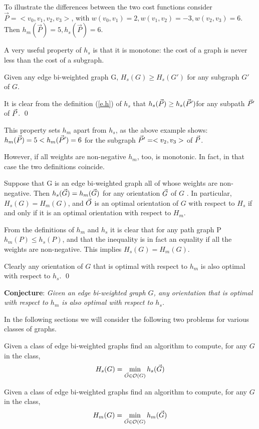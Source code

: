  To illustrate the differences between the two cost functions consider\\
 $\vec{P}=<v_0,v_1,v_2,v_3>$, with $w(v_0,v_1)=2, w(v_1,v_2)=-3,w(v_2,v_3)=6$.
 Then $h_m(\vec{P})=5, h_s(\vec{P})=6$.

A very useful property of $h_s$ is that it is monotone: the cost of a graph is never less than the cost of a subgraph.
\begin{lemma}\label{l.sprop}
	Given any edge bi-weighted graph G,
	$H_{s}(G)\geq  H_{s}(G')$ for any subgraph $G'$ of $G$. 
\end{lemma}

It is clear from the definition (\ref{e.h}) of $h_s$ that $h_s(\vec{P})\geq h_s(\vec{P} ')$for any subpath 
$\vec{P} '$ of $\vec{P}$.  
\qed

This property sets $h_m$ apart from $h_s$,  as the above example shows:
$h_{m}(\vec{P})=5 <  h_{m}(\vec{P}')=6$ for the subgraph $\vec{P} '=<v_2,v_3>$ of $\vec{P}$.

However, if all weights are non-negative $h_m$, too, is monotonic. In fact, in that case the two definitions coincide.

\begin{lemma}
	Suppose that G is an edge bi-weighted graph  all of whose weights are non-negative.
	Then $h_{s}( \vec{G} )= h_{m}( \vec{G} )$ for any orientation $\vec{G}$ of $G$ .
	In particular,  $H_{s}(G)= H_{m}(G)$,  and 
	$\vec{O}$ is an optimal orientation of $G$ with respect to $H_{s}$
	if and only if it is an optimal orientation with respect to $ H_{m} $.
\end{lemma}
From the definitions of $h_m$ and $h_s$ it is clear that for any path graph P  $h_{m}(P)\leq  h_{s}(P)$, and that the inequality is in fact an equality if all the weights 
are non-negative. This implies $H_{s}(G)= H_{m}(G)$.

Clearly any orientation of $G$ that is optimal with respect to $h_m$ is also 
optimal with respect to $h_s$. 
\qed

\bigskip
{\bf Conjecture}:
\textit{Given an edge bi-weighted graph $G$, any orientation that is optimal with 
	respect to $h_{m}$ is also optimal with respect to $h_{s} $.}

\bigskip
In the following sections we will consider the following two problems
for various classes of graphs.

\begin{problem}
	Given a class of edge bi-weighted graphs find an algorithm to compute, for any $G$
	in the class,  
	$$
	H_s(G) = \min_{\vec{O} \in \mathcal{O}(G)} h_s(\vec{G})
	$$
\end{problem}

\begin{problem}
	Given a class of edge bi-weighted graphs find an algorithm to compute, for any $G$
	in the class,  
	$$
H_m(G) = \min_{\vec{O} \in \mathcal{O}(G)} h_m (\vec{G})
	$$
\end{problem}
